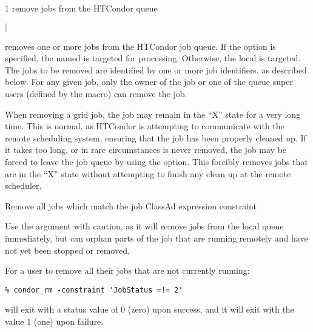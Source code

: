 \begin{ManPage}{\label{man-condor-rm}}{1}
{remove jobs from the HTCondor queue}

\Synopsis {}
\ToolArgsBase

\ToolDebugOption
{}
\ToolLocate
\ToolJobs
$|$  \Dots

\ToolDebugOption
\ToolLocate
\ToolAll

\Description

 removes one or more jobs from the HTCondor job queue.  
If the  option is specified, the named  is targeted
for processing.  
Otherwise, the local  is targeted.
The jobs to be removed are identified by one or more job identifiers, as
described below.
For any given job, only the owner of the job or one of the queue super users
(defined by the  macro) can remove the job.

When removing a grid job, the job may remain in
the ``X'' state for a very long time. 
This is normal, as HTCondor is attempting to communicate with the
remote scheduling system, 
ensuring that the job has been properly cleaned up.
If it takes too long, or in rare circumstances is never removed,
the job may be forced to
leave the job queue by using the  option.
This forcibly removes jobs that are in the ``X'' state without attempting
to finish any clean up at the remote scheduler.

\begin{Options}
	\ToolArgsBaseDesc
	\ToolLocateDesc
        \ToolDebugDesc
	 {Remove all jobs which match
	                the job ClassAd expression constraint}
\end{Options}

\GenRem

Use the  argument with caution, as it will remove jobs
from the local queue immediately, but can orphan parts of the job
that are running remotely and have not yet been stopped or removed.

\Examples
For a user to remove all their jobs that are not currently running:
\footnotesize
\begin{verbatim}
% condor_rm -constraint 'JobStatus =!= 2'
\end{verbatim}
\normalsize

\ExitStatus

 will exit with a status value of 0 (zero) upon success,
and it will exit with the value 1 (one) upon failure.

\end{ManPage}
